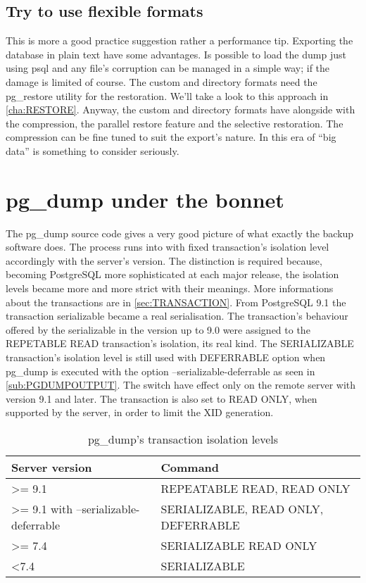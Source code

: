 \subsection{Try to use flexible formats}
This is more a good practice suggestion rather a performance tip. Exporting the database in plain 
text have some advantages. Is possible to load the dump just using psql and any file's corruption 
can be managed in a simple way; if the damage is limited of course. The custom and directory 
formats need the pg\_restore utility for the restoration. We'll take a look to this approach in 
\ref{cha:RESTORE}. Anyway, the custom and directory formats have alongside with the compression, 
the parallel restore feature and the selective restoration. The compression can be fine tuned to 
suit the export's nature. In this era of ``big data'' is something to consider seriously.


\section{pg\_dump under the bonnet}
\label{sec:PGDUMPINT}
The pg\_dump source code gives a very good picture of what exactly the backup 
software does. The process runs into with fixed transaction's isolation level accordingly with the 
server's version. 
The distinction is required because, becoming PostgreSQL more sophisticated at each major release, 
the isolation levels became more and more strict with their meanings.\newline
More informations about the transactions are in \ref{sec:TRANSACTION}.\newline
From PostgreSQL 9.1 the transaction serializable became a real serialisation. The 
transaction's behaviour offered by the serializable in the version up to 9.0 were assigned to the 
REPETABLE READ transaction's isolation, its real kind. The SERIALIZABLE transaction's isolation 
level is still used with DEFERRABLE option when pg\_dump is executed with 
the option --serializable-deferrable as seen in \ref{sub:PGDUMPOUTPUT}. The switch have effect only 
on the remote server with version 9.1 and later. The transaction is also set to READ ONLY, when 
supported by the server, in order to limit the XID generation. \newline

\begin{table}[H]
  \begin{tabular}{ll}
    Server version & Command    \\ 
    \hline
    \textgreater=  9.1 &  REPEATABLE READ, READ ONLY        \\
    \textgreater= 9.1 with --serializable-deferrable  &  SERIALIZABLE, READ ONLY, DEFERRABLE  \\
    \textgreater= 7.4 &  SERIALIZABLE READ ONLY   \\
    \textless 7.4 &  SERIALIZABLE \\
  \end{tabular}
  \caption{\label{tab:TRNPGDUMP}pg\_dump's transaction isolation levels }
\end{table}

